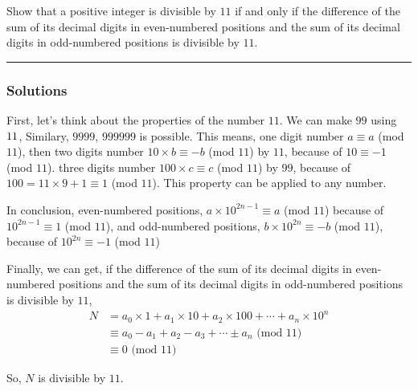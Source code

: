 \newpage
\begin{question}
Show that a positive integer is divisible by $11$ if and only
if the difference of the sum of its decimal digits in even-numbered
positions and the sum of its decimal digits in
odd-numbered positions is divisible by $11$.

\end{question}

\par\noindent\rule{\textwidth}{0.5pt}

\subsubsection*{Solutions}
\indent\indent
First, let's think about the properties of the number $11$. We can make $99$ using $11 \time 9$, Similary, $9999$, $999999$ is possible. This means, one digit number $a \equiv a$ (mod $11$), then two digits number $10 \times b \equiv -b $ (mod $11$) by $11$, because of $10 \equiv -1$ (mod $11$). three digits number $100 \times c \equiv c$ (mod $11$) by $99$, because of $100 = 11\times9 + 1 \equiv 1$ (mod $11$). This property can be applied to any number.

\bigskip
In conclusion, even-numbered positions, $a \times 10 ^ {2n - 1} \equiv a$ (mod $11$) because of $10 ^ {2n - 1} \equiv 1$ (mod $11$), and odd-numbered positions, $b \times 10 ^ {2n} \equiv -b$ (mod $11$), because of $10 ^{2n} \equiv -1$ (mod $11$)

\bigskip
Finally, we can get, if the difference of the sum of its decimal digits in even-numbered positions and the sum of its decimal digits in odd-numbered positions is divisible by $11$,
\begin{align*}
    N & = a_0 \times 1 + a_1 \times 10 + a_2 \times 100 + \cdots + a_n \times 10 ^ n \\
    & \equiv a_0 - a_1 + a_2 - a_3 + \cdots \pm a_n  \text{ (mod 11)}\\
    & \equiv 0 \text{ (mod 11)}
\end{align*}

So, $N$ is divisible by $11$.
